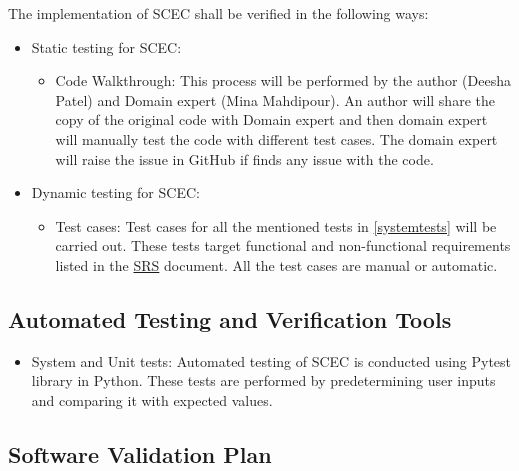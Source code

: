 \documentclass[12pt, titlepage]{article}
\begin{document}
The implementation of SCEC shall be verified in the following ways:

\begin{itemize}

\item Static testing for SCEC:

\begin{itemize}


\item Code Walkthrough: This process will be performed by the author (Deesha Patel) and Domain expert (Mina Mahdipour). An author will share the copy of the original code with Domain expert and then domain expert will manually test the code with different test cases. The domain expert will raise the issue in GitHub if finds any issue with the code.

\end{itemize}
\end{itemize}

\begin{itemize}

\item Dynamic testing for SCEC:

\begin{itemize}


\item Test cases: Test cases for all the mentioned tests in \autoref{systemtests} will be carried out. These tests target functional and non-functional requirements listed in the \href{https://github.com/DeeshaPatel/CAS-741-Solar-Cooker/blob/7c53c8d9a19ca2f94dfba6ba9208eae0bf03b8cc/docs/SRS/SRS.pdf}{SRS} document. All the test cases are manual or automatic.  

\end{itemize}
\end{itemize}



\subsection{Automated Testing and Verification Tools}

\begin{itemize}
    \item System and Unit tests: Automated testing of SCEC is conducted using Pytest library in Python. These tests are performed by predetermining user inputs and comparing it with expected values. 
\end{itemize}

\subsection{Software Validation Plan}
\end{document}
